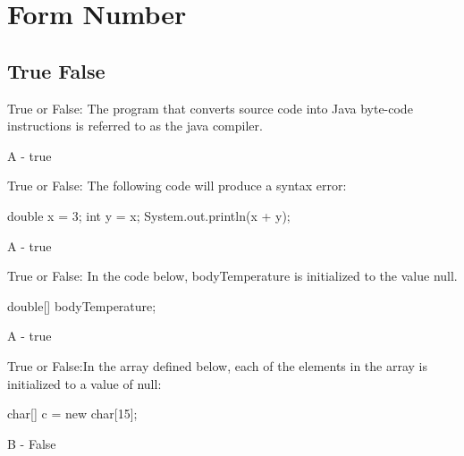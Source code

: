 \documentclass[11pt,answers]{exam}
\begin{document}
\section*{Form Number}
\begin{center}
\end{center}

\newpage

\begin{questions}

\section*{True False}

\question[1] True or False: The program that converts source code into Java byte-code instructions is referred to as the java compiler.
\begin{solution} A - true \end{solution}

\question[1] True or False: The following code will produce a syntax error: \newline
\begin{tt}
double x = 3; \newline
int y = x; \newline
System.out.println(x + y);
\end{tt}
\begin{solution} A - true \end{solution}

\question[1] True or False: In the code below, bodyTemperature is initialized to the value null. \newline
\begin{tt}
double[] bodyTemperature;
\end{tt}
\begin{solution} A - true \end{solution}

\question[1] True or False:In the array defined below, each of the elements in the array is initialized to a value of null: \newline
\begin{tt}
char[] c = new char[15];
\end{tt}
\begin{solution} B - False \end{solution}


\end{questions}
\end{document}
